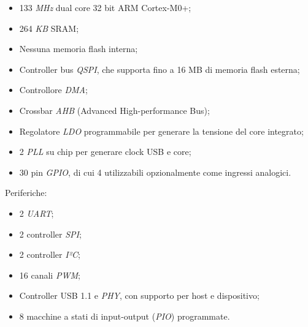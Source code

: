 \begin{itemize}
\item
  
  133 \emph{MHz} dual core 32 bit ARM Cortex-M0+;
  
\item
  
  264 \emph{KB} SRAM;
  
\item
  
  Nessuna memoria flash interna;
  
\item
  
  Controller bus \emph{QSPI}, che supporta fino a 16 MB di memoria flash
  esterna;
  
\item
  
  Controllore \emph{DMA};
  
\item
  
  Crossbar \emph{AHB} (Advanced High-performance Bus);
  
\item
  
  Regolatore \emph{LDO} programmabile per generare la tensione del core
  integrato;
  
\item
  
  2 \emph{PLL} su chip per generare clock USB e core;
  
\item
  
  30 pin \emph{GPIO}, di cui 4 utilizzabili opzionalmente come ingressi
  analogici.
  
\end{itemize}

\noindent Periferiche:

\begin{itemize}
\item
  
  2 \emph{UART};
  
\item
  
  2 controller \emph{SPI};
  
\item
  
  2 controller \emph{I²C};
  
\item
  
  16 canali \emph{PWM};
  
\item
  
  Controller USB 1.1 e \emph{PHY}, con supporto per host e dispositivo;
  
\item
  
  8 macchine a stati di input-output (\emph{PIO}) programmate.
  
\end{itemize}

